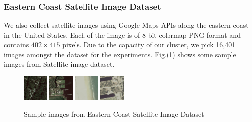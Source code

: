 \documentclass{acm_proc_article-sp}
\begin{document}
\subsubsection{Eastern Coast Satellite Image Dataset}
We also collect satellite images using Google Maps APIs along the eastern coast in the United States. Each of the image is of 8-bit colormap PNG format and contains $402\times415$ pixels. Due to the capacity of our cluster, we pick 16,401 images amongst the dataset for the experiments. Fig.(\ref{fig:gmaps}) shows some sample images from Satellite image dataset.
\begin{figure}[!htb]
\centering
\includegraphics[width=0.11\textwidth]{fig/sample-gmaps1}
\includegraphics[width=0.11\textwidth]{fig/sample-gmaps2}
\includegraphics[width=0.11\textwidth]{fig/sample-gmaps3}
\includegraphics[width=0.11\textwidth]{fig/sample-gmaps4}
\caption{Sample images from Eastern Coast Satellite Image Dataset}\label{fig:gmaps}
\end{figure}
\end{document}
